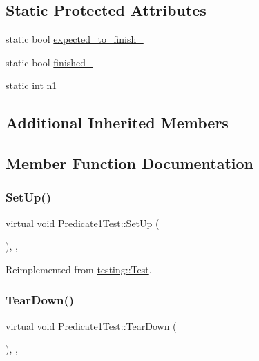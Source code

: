 \subsection*{Static Protected Attributes}
\begin{DoxyCompactItemize}
\item 
static bool \hyperlink{class_predicate1_test_ad91cfa58e6352d53abacce32df2ef635}{expected\+\_\+to\+\_\+finish\+\_\+}
\item 
static bool \hyperlink{class_predicate1_test_a6d45fb2d1f01a5c8baf28f60039c244e}{finished\+\_\+}
\item 
static int \hyperlink{class_predicate1_test_a528d9f7f618b17802962a3824eea11e3}{n1\+\_\+}
\end{DoxyCompactItemize}
\subsection*{Additional Inherited Members}


\subsection{Member Function Documentation}
\mbox{\label{class_predicate1_test_a481704a09f73a37158513f9a336dbdd9}} 
\subsubsection{\texorpdfstring{Set\+Up()}{SetUp()}}
{\footnotesize\ttfamily virtual void Predicate1\+Test\+::\+Set\+Up (\begin{DoxyParamCaption}{ }\end{DoxyParamCaption})\hspace{0.3cm}{\ttfamily [inline]}, {\ttfamily [protected]}, {\ttfamily [virtual]}}



Reimplemented from \hyperlink{classtesting_1_1_test_a190315150c303ddf801313fd1a777733}{testing\+::\+Test}.

\mbox{\label{class_predicate1_test_ad2974af5c6abc508847c3a9912b24a90}} 
\subsubsection{\texorpdfstring{Tear\+Down()}{TearDown()}}
{\footnotesize\ttfamily virtual void Predicate1\+Test\+::\+Tear\+Down (\begin{DoxyParamCaption}{ }\end{DoxyParamCaption})\hspace{0.3cm}{\ttfamily [inline]}, {\ttfamily [protected]}, {\ttfamily [virtual]}}



